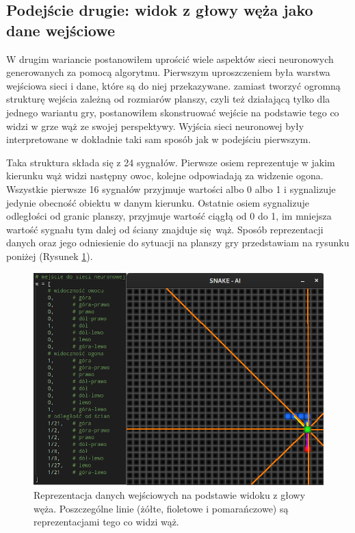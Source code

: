 \documentclass[12pt, oneside, a4paper]{report}
\begin{document}
\subsection{Podejście drugie: widok z głowy węża jako dane wejściowe}

W drugim wariancie postanowiłem uprościć wiele aspektów sieci neuronowych generowanych za pomocą algorytmu. Pierwszym uproszczeniem była warstwa wejściowa sieci i dane, które są do niej przekazywane. zamiast tworzyć ogromną strukturę wejścia zależną od rozmiarów planszy, czyli też działającą tylko dla jednego wariantu gry, postanowiłem skonstruować wejście na podstawie tego co widzi w grze wąż ze swojej perspektywy. Wyjścia sieci neuronowej były interpretowane w dokładnie taki sam sposób jak w podejściu pierwszym.

Taka struktura składa się z 24 sygnałów. Pierwsze osiem reprezentuje w jakim kierunku wąż widzi następny owoc, kolejne odpowiadają za widzenie ogona. Wszystkie pierwsze 16 sygnałów przyjmuje wartości albo 0 albo 1 i sygnalizuje jedynie obecność obiektu w danym kierunku. Ostatnie osiem sygnalizuje odległości od granic planszy, przyjmuje wartość ciągłą od 0 do 1, im mniejsza wartość sygnału tym dalej od ściany znajduje się wąż. Sposób reprezentacji danych oraz jego odniesienie do sytuacji na planszy gry przedstawiam na rysunku poniżej (Rysunek \ref{fig: 4.head-view}).

\begin{figure}[h]
	\centering
	\includegraphics[width=12cm]{head-view.png}
	\caption{Reprezentacja danych wejściowych na podstawie widoku z głowy węża. Poszczególne linie (żółte, fioletowe i pomarańczowe) są reprezentacjami tego co widzi wąż.}
	\label{fig: 4.head-view}
\end{figure}
\end{document}
